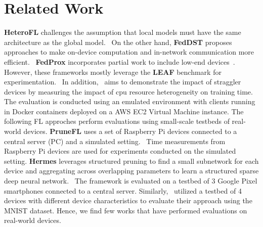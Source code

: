 \section{Related Work}
    \textbf{HeteroFL} challenges the assumption that local models must have the same architecture as the global model.~\cite{DBLP:journals/corr/abs-2010-01264} On the other hand, \textbf{FedDST} proposes approaches to make on-device computation and in-network communication more efficient.~\cite{DBLP:journals/corr/abs-2112-09824} \textbf{FedProx} incorporates partial work to include low-end devices~\cite{DBLP:journals/corr/abs-1812-06127}. However, these frameworks mostly leverage the \textbf{LEAF} benchmark for experimentation.~\cite{DBLP:journals/corr/abs-1812-01097} In addition,~\cite{232971} aims to demonstrate the impact of straggler devices by measuring the impact of cpu resource heterogeneity on training time. The evaluation is conducted using an emulated environment with clients running in Docker containers deployed on a AWS EC2 Virtual Machine instance. The following FL approches perform evaluations using small-scale testbeds of real-world devices. \textbf{PruneFL} uses a set of Raspberry Pi devices connected to a central server (PC) and a simulated setting.~\cite{DBLP:journals/corr/abs-1909-12326} Time measurements from Raspberry Pi devices are used for experiments conducted on the simulated setting. \textbf{Hermes} leverages structured pruning to find a small subnetwork for each device and aggregating across overlapping parameters to learn a structured sparse deep neural network.~\cite{10.1145/3447993.3483278} The framework is evaluated on a testbed of 3 Google Pixel smartphones connected to a central server. Similarly,~\cite{9139810} utilized a testbed of 4 devices with different device characteristics to evaluate their approach using the MNIST dataset. Hence, we find few works that have performed evaluations on real-world devices.

